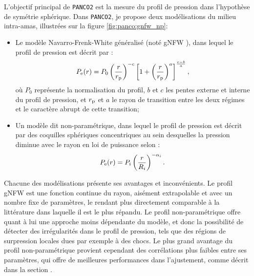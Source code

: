 L'objectif principal de \texttt{PANCO2} est la mesure du profil de pression dans l'hypothèse de symétrie sphérique.
Dans \texttt{PANCO2}, je propose deux modélisations du milieu intra-amas, illustrées sur la figure \ref{fig:panco:gnfw_np}:
\begin{itemize}[leftmargin=*]
    \setlength\itemsep{5pt}
    \item Le modèle Navarro-Frenk-White généralisé (noté \guillemotleft gNFW \guillemotright), dans lequel le profil de pression est décrit par \cite{zhao_analytical_1996,nagai_effects_2007} :
    \begin{equation}
        \label{eq:panco:gnfw}
        P_{\rm e}(r) = P_0
        \left(\frac{r}{r_{\rm p}}\right)^{-c}
        \left[1 + \left(\frac{r}{r_{\rm p}}\right)^a \right]^\frac{c-b}{a} ,
    \end{equation}
    où $P_0$ représente la normalisation du profil, $b$ et $c$ les pentes externe et interne du profil de pression, et $r_{\rm p}$ et $a$ le rayon de transition entre les deux régimes et le caractère abrupt de cette transition;

\item Un modèle dit \guillemotleft non-paramétrique\footnotemark\guillemotright, dans lequel le profil de pression est décrit par des coquilles sphériques concentriques au sein desquelles la pression diminue avec le rayon en loi de puissance selon \cite{ruppin_non-parametric_2017,romero_multi-instrument_2018}:
    \begin{equation}
        \label{eq:panco:nonparam}
        P_{\rm e}(r) = P_i \left(\frac{r}{R_i}\right)^{-\alpha_i} .
    \end{equation}
\end{itemize}

Chacune des modélisations présente ses avantages et inconvénients.
Le profil gNFW est une fonction continue du rayon, aisément extrapolable et avec un nombre fixe de paramètres, le rendant plus directement comparable à la littérature dans laquelle il est le plus répandu.
Le profil non-paramétrique offre quant à lui une approche moins dépendante du modèle, et donc la possibilité de détecter des irrégularités dans le profil de pression, tels que des régions de surpression locales dues par exemple à des chocs.
Le plus grand avantage du profil non-paramétrique provient cependant des corrélations plus faibles entre ses paramètres, qui offre de meilleures performances dans l'ajustement, comme décrit dans la section .

